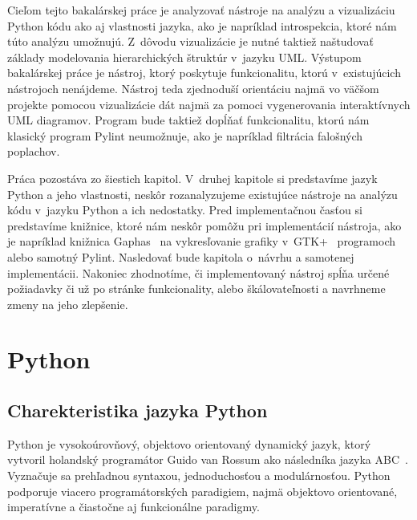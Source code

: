 \documentclass[11pt,oneside,final]{fithesis2}
\begin{document}
	Cieľom tejto bakalárskej práce je analyzovať nástroje na analýzu a vizualizáciu Python kódu ako aj vlastnosti jazyka, ako je napríklad introspekcia, ktoré nám túto analýzu umožnujú. Z~dôvodu vizualizácie je nutné taktiež naštudovať základy modelovania hierarchických štruktúr v~jazyku UML. Výstupom bakalárskej práce je nástroj, ktorý poskytuje funkcionalitu, ktorú v~existujúcich nástrojoch nenájdeme. Nástroj teda zjednoduší orientáciu najmä vo väčšom projekte pomocou vizualizácie dát najmä za pomoci vygenerovania interaktívnych UML diagramov. Program bude taktiež dopĺňať funkcionalitu, ktorú nám klasický program Pylint neumožnuje, ako je napríklad filtrácia falošných poplachov. 

	Práca pozostáva zo šiestich kapitol. V~druhej kapitole si predstavíme jazyk Python a jeho vlastnosti, neskôr rozanalyzujeme existujúce nástroje na analýzu kódu v~jazyku Python a ich nedostatky. Pred implementačnou časťou si predstavíme knižnice, ktoré nám neskôr pomôžu pri implementácií nástroja, ako je napríklad knižnica Gaphas~\cite{gaphas} na vykresľovanie grafiky v~GTK+~\cite{gtkplus} programoch alebo samotný Pylint. Nasledovať bude kapitola o~návrhu a samotenej implementácii. Nakoniec zhodnotíme, či implementovaný nástroj spĺňa určené požiadavky či už po stránke funkcionality, alebo škálovateľnosti a navrhneme zmeny na jeho zlepšenie.
 


%
%
%

\chapter{Python}

	\section{Charekteristika jazyka Python}
	Python je vysokoúrovňový, objektovo orientovaný dynamický jazyk, ktorý vytvoril holandský programátor Guido van Rossum ako následníka jazyka ABC~\cite{abc}.
Vyznačuje sa prehľadnou syntaxou, jednoduchosťou a modulárnosťou. Python podporuje viacero programátorských paradigiem, najmä objektovo orientované, imperatívne a čiastočne aj funkcionálne paradigmy.
\end{document}
